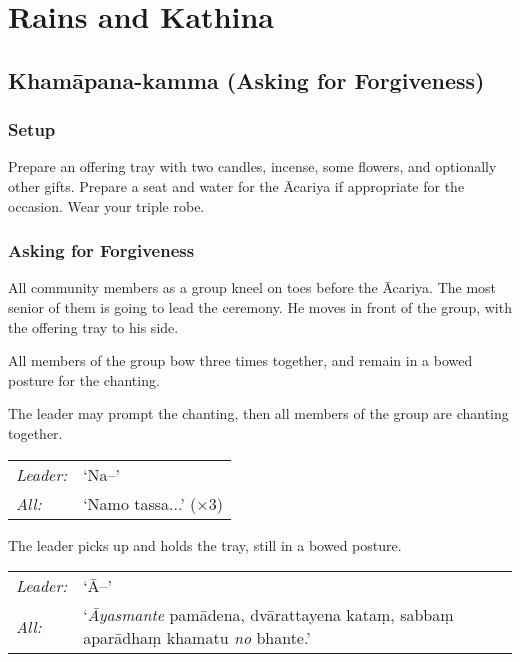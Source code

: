 \chapter{Rains and Kathina}

\section{Khamāpana-kamma (Asking for Forgiveness)}
\label{asking-forgiveness}

\subsection*{Setup}

Prepare an offering tray with two candles, incense, some flowers, and optionally
other gifts. Prepare a seat and water for the Ācariya if appropriate for the
occasion. Wear your triple robe.

\subsection*{Asking for Forgiveness}

All community members as a group kneel on toes before the Ācariya.
The most senior of them is going to lead the ceremony.
He moves in front of the group, with the offering tray to his side.

All members of the group bow three times together, and remain in a bowed posture
for the chanting.

The leader may prompt the chanting, then all members of the group are chanting
together.

\begin{tabular}{@{}L{3em}L{10em}@{}}
\hspace*{1.5em}\emph{Leader:} & ‘Na--’\\
\hspace*{1.5em}\emph{All:} & ‘Namo tassa...’ (×3)\\
\end{tabular}

The leader picks up and holds the tray, still in a bowed posture.

\begin{tabular}{@{}L{3em}L{18em}@{}}
\hspace*{1.5em}\emph{Leader:} & ‘Ā--’\\
\hspace*{1.5em}\emph{All:} & ‘\emph{Āyasmante} pamādena, dvārattayena kataṃ, sabbaṃ aparādhaṃ khamatu \emph{no} bhante.’\\
\end{tabular}

